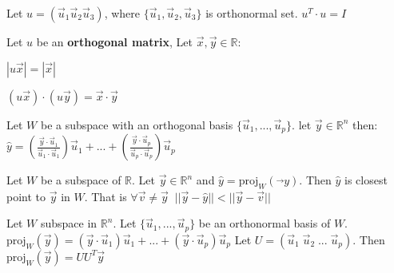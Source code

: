 \documentclass[5pt]{article}
\begin{document}
\begin{multicols}{2}
\begin{theorem}
  Let $u=(\vec{u}_1 \vec{u}_2 \vec{u}_3)$, where $\{\vec{u}_1, \vec{u}_2, \vec{u}_3\}$ is orthonormal set.
  $u^T\cdot u= I$
\end{theorem}

\begin{theorem}
  Let $u$ be an \textbf{orthogonal matrix}, Let $\vec{x},\vec{y}\in\mathbb{R}$:
  \begin{itemize*}
    \item $|u\vec{x}|=|\vec{x}|\:$
    \item $(u\vec{x})\cdot(u\vec{y})=\vec{x}\cdot\vec{y}$
  \end{itemize*}
\end{theorem}

\begin{theorem}
  Let $W$ be a subspace with an orthogonal basis $\{\vec{u}_1,...,\vec{u}_p\}$. let $\vec{y}\in\mathbb{R}^n$ then: 
  $\hat{y}=\left(\frac{\vec{y}\cdot\vec{u}_1}{\vec{u}_1\cdot\vec{u}_1}\right)\vec{u}_1 + ... + \left(\frac{\vec{y}\cdot\vec{u}_p}{\vec{u}_p\cdot\vec{u}_p}\right)\vec{u}_p$
\end{theorem}

\begin{theorem}
  Let $W$ be a subspace of $\mathbb{R}$. Let $\vec{y}\in\mathbb{R}^n$ and $\hat{y}=\text{proj}_W(\vec{}y)$. 
  Then $\hat{y}$ is closest point to $\vec{y}$ in $W$. That is $\forall\vec{v}\ne\vec{y}\;\; ||\vec{y}-\hat{y}||<||\vec{y}-\vec{v}||$  
\end{theorem}

\begin{theorem}
  Let $W$ subspace in $\mathbb{R}^n$. 
  Let $\{\vec{u}_1, ..., \vec{u}_p\}$ be an orthonormal basis of  $W$.
  $\text{proj}_W(\vec{y})=(\vec{y}\cdot\vec{u}_1)\vec{u}_1 + ... + (\vec{y}\cdot\vec{u}_p)\vec{u}_p$
  Let $U=(\vec{u}_1\; \vec{u}_2\; ...\; \vec{u}_p)$. Then $\text{proj}_W(\vec{y})=UU^T\vec{y}$
\end{theorem}


\end{multicols}
\end{document}
